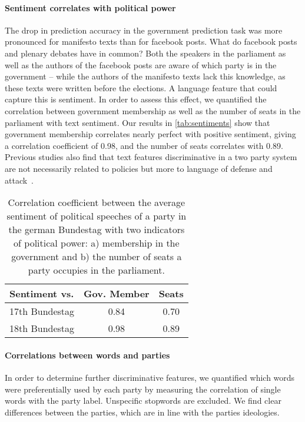 \documentclass[11pt]{article}
\begin{document}
\paragraph{Sentiment correlates with political power}
The drop in prediction accuracy in the government prediction task was more pronounced for manifesto texts than for facebook posts. What do facebook posts and plenary debates have in common? Both the speakers in the parliament as well as the authors of the facebook posts are aware of which party is in the government -- while the authors of the manifesto texts lack this knowledge, as these texts were written before the elections. A language feature that could capture this is sentiment. 
In order to assess this effect, we quantified the correlation between government membership as well as the number of seats in the parliament with text sentiment. Our results in \autoref{tab:sentiments} show that government membership correlates nearly perfect with positive sentiment, giving a correlation coefficient of 0.98, and the number of seats correlates with 0.89. Previous studies also find that text features discriminative in a two party system are not necessarily related to policies but more to language of defense and attack~\cite{Hirst2014}. 

\begin{table}[t]
\caption{
\label{tab:sentiments}
Correlation coefficient between the average sentiment of political speeches of a party in the german Bundestag with two indicators of political power: a) membership in the government and b) the number of seats a party occupies in the parliament.
}
\begin{center}
\begin{tabular}{lcc}
   Sentiment vs. &          Gov. Member    &  Seats\\
\hline\hline
17th Bundestag    &  0.84 & 0.70\\
18th Bundestag   &  0.98 & 0.89\\
%
\end{tabular}
\end{center}
\end{table}


%
\paragraph{Correlations between words and parties}
In order to determine further discriminative features, we quantified which words were preferentially used by each party by measuring the correlation of single words with the party label. Unspecific stopwords are excluded. We find clear differences between the parties, which are in line with the parties ideologies. 
\end{document}
